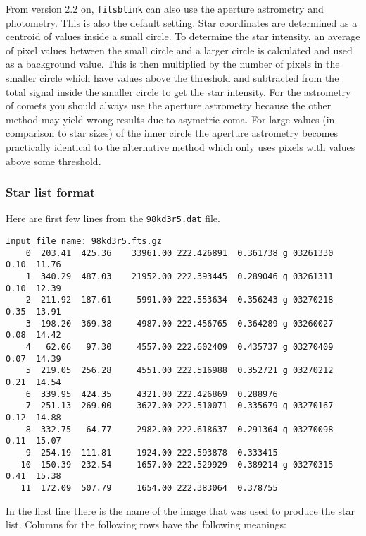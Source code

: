 \documentclass[11pt]{article}
\begin{document}
From version 2.2 on, \verb=fitsblink= can also use the aperture
astrometry and photometry.  This is also the default setting.  Star
coordinates are determined as a centroid of values inside a small
circle.  To determine the star intensity, an average of pixel values
between the small circle and a larger circle is calculated and used as
a background value.  This is then multiplied by the number of pixels
in the smaller circle which have values above the threshold and
subtracted from the total signal inside the smaller circle to get the
star intensity.  For the astrometry of comets you should always use
the aperture astrometry because the other method may yield wrong
results due to asymetric coma.  For large values (in comparison to
star sizes) of the inner circle the aperture astrometry becomes
practically identical to the alternative method which only uses pixels
with values above some threshold.

\subsubsection{Star list format}

Here are first few lines from the \verb=98kd3r5.dat= file.

\begin{verbatim}
Input file name: 98kd3r5.fts.gz
    0  203.41  425.36    33961.00 222.426891  0.361738 g 03261330   0.10  11.76
    1  340.29  487.03    21952.00 222.393445  0.289046 g 03261311   0.10  12.39
    2  211.92  187.61     5991.00 222.553634  0.356243 g 03270218   0.35  13.91
    3  198.20  369.38     4987.00 222.456765  0.364289 g 03260027   0.08  14.42
    4   62.06   97.30     4557.00 222.602409  0.435737 g 03270409   0.07  14.39
    5  219.05  256.28     4551.00 222.516988  0.352721 g 03270212   0.21  14.54
    6  339.95  424.35     4321.00 222.426869  0.288976
    7  251.13  269.00     3627.00 222.510071  0.335679 g 03270167   0.12  14.88
    8  332.75   64.77     2982.00 222.618637  0.291364 g 03270098   0.11  15.07
    9  254.19  111.81     1924.00 222.593878  0.333415
   10  150.39  232.54     1657.00 222.529929  0.389214 g 03270315   0.41  15.38
   11  172.09  507.79     1654.00 222.383064  0.378755
\end{verbatim}
In the first line there is the name of the image that was used to
produce the star list. Columns for the following rows have the
following meanings:
\end{document}

